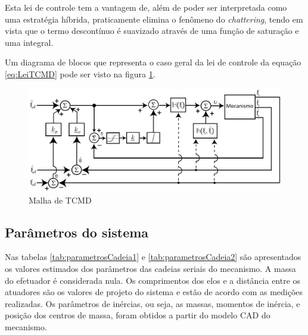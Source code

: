 \documentclass[]{politex}
\begin{document}
Esta lei de controle tem a vantagem de, além de poder ser interpretada como uma estratégia híbrida, praticamente elimina o fenômeno do \emph{chattering}, tendo em vista que o termo descontínuo é suavizado através de uma função de saturação e uma integral.

Um diagrama de blocos que representa o caso geral da lei de controle da equação \eqref{eq:LeiTCMD} pode ser visto na figura \ref{fig:TCMD}.
\begin{figure}[h]
	\centering
	\includegraphics[scale=0.39]{../figures/TCMD.jpg}  
	\caption{Malha de TCMD}
	\label{fig:TCMD}
\end{figure}


\subsection{Parâmetros do sistema}

Nas tabelas \ref{tab:parametrosCadeia1} e \ref{tab:parametrosCadeia2} são apresentados os valores estimados dos parâmetros das cadeias seriais do mecanismo. A massa do efetuador é considerada nula. Os comprimentos dos elos e a distância entre os atuadores são os valores de projeto do sistema e estão de acordo com as medições realizadas. Os parâmetros de inércias, ou seja, as massas, momentos de inércia, e posição dos centros de massa, foram obtidos a partir do modelo CAD do mecanismo.
\end{document}

